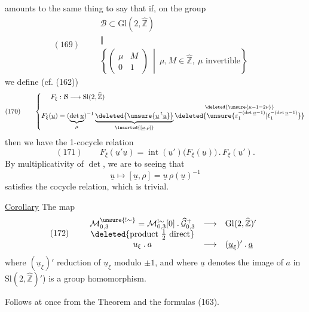  amounts to the same thing to say that if,
on the group
\[
(169)\qquad
\begin{array}{ll}
\mathcal B\subset\mathrm{Gl}(2,\widehat{\mathbb Z})&\\
\Vert&\\[-2pt]
\left\{\begin{pmatrix}\mu&M\\0&1\end{pmatrix}
\ \middle|\ \mu,M\in\widehat{\mathbb Z},\ \mu\text{ invertible}\right\}&
\end{array}
\]
we define (cf. (162))
\[
(170)\qquad
\left\{\begin{aligned}
F_\xi &: \mathcal B\longrightarrow\mathrm{Sl}(2,\widehat{\mathbb Z})\\
F_\xi(\underline u)
&=(\underbrace{\det\underline u}_{\mu})^{-1}
\underbrace{\deleted{\unsure{\underline u\,{}^t\underline u}}}
_{\inserted{[\underline u,\rho]}}
\overset{\deleted{\unsure{\mu-1=2\nu}}}
{\deleted{\unsure{\varepsilon_1^{-(\det\underline u-1)}|\ell_1^{-(\det\underline u-1)}}}}
\end{aligned}\right.
\]
then we have the 1-cocycle relation
\[
(171)\qquad
F_\xi(\underline u'\underline u)
=\operatorname{int}(\underline u')\bigl(F_\xi(\underline u)\bigr)
\mathbin{.}F_\xi(\underline u').
\]
By multiplicativity of $\det$, we are 
to seeing that
\[
\underline u\longmapsto[\underline u,\rho]
=\underline u\,\rho(\underline u)^{-1}
\]
satisfies the cocycle relation, which is trivial.

\uline{Corollary} The map
\[
(172)\qquad
\begin{array}{ccl}
\mathcal M_{0,3}^{\unsure{!\sim}}
=\mathcal M_{0,3}^{!\sim}[0]\mathbin{.}
\widehat{\mathcal G}_{0,3}^{+}
&\longrightarrow&\mathrm{Gl}(2,\widehat{\mathbb Z})'\\
\deleted{\text{product }\tfrac12\text{ direct}}&&\\
u_\xi\mathbin{.}a&\longrightarrow&(\underline u_\xi)'\mathbin{.}\underline a
\end{array}
\]
where $(\underline u_\xi)'$  reduction of $\underline u_\xi$
modulo $\pm1$, and where $\underline a$ denotes the image of $a$ in
$\mathrm{Sl}(2,\widehat{\mathbb Z})'$) is a group homomorphism.

Follows at once from the Theorem and the formulas (163).

